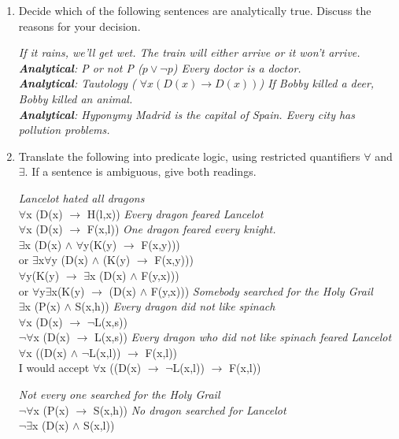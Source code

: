 \documentclass[a4paper]{article}
\newcommand{\ix}{\ex\it}
\newcommand{\into}{\ensuremath{\rightarrow}}
\begin{document}
\begin{enumerate}
\item Decide which of the following sentences are analytically
  true. Discuss the reasons for your decision.
\begin{exe}
  \ix If it rains, we'll get wet. 
  \ix The train will either arrive or it won't arrive.
  \\ \textnormal{\textbf{Analytical}: P or not P ($p \vee \neg p$)}
  \ix Every doctor is a doctor.
  \\ \textnormal{\textbf{Analytical}: Tautology ( $\forall x (D(x) \into D(x))$)}
  \ix If Bobby killed a deer, Bobby killed an animal.
  \\ \textnormal{\textbf{Analytical}: Hyponymy}
  \ix Madrid is the capital of Spain. 
  \ix Every city has pollution problems. 
\end{exe}

\newpage
\item  Translate the following into predicate logic, using restricted
  quantifiers $\forall$ and $\exists$.  If a sentence is ambiguous,
  give both readings.
 \begin{exe}
    \ex \textit{Lancelot hated all dragons} \\
    $\forall$x (D(x)  $\into$ H(l,x))
    \ex \textit{Every dragon feared Lancelot} \\
    $\forall$x (D(x)  $\into$ F(x,l))
    \ex \textit{One dragon feared every knight.} \\
    $\exists$x  (D(x)  $\wedge$ $\forall$y(K(y)  $\into$ F(x,y)))
    \\ or  $\exists$x$\forall$y (D(x)  $\wedge$ (K(y)  $\into$ F(x,y)))
 \\   $\forall$y(K(y)   $\into$ $\exists$x  (D(x)  $\wedge$  F(y,x)))
 \\ or $\forall$y$\exists$x(K(y)   $\into$   (D(x)  $\wedge$  F(y,x)))
    \ex \textit{Somebody searched for the Holy Grail} \\
    $\exists$x  (P(x)  $\wedge$ S(x,h))
    \ex \textit{Every dragon did not like spinach} \\
    $\forall$x (D(x)  $\into$ $\neg$L(x,s))
    \\ $\neg\forall$x (D(x)  $\into$ L(x,s))
    \ex \textit{Every dragon who did not like spinach feared Lancelot} \\
    $\forall$x ((D(x)  $\wedge$ $\neg$L(x,l)) $\into$  F(x,l))
    \\ I would accept  $\forall$x ((D(x)  $\into$ $\neg$L(x,l)) $\into$  F(x,l))

    \ex \textit{Not every one searched for the Holy Grail} \\
    $\neg\forall$x (P(x)  $\into$ S(x,h))
    \ex \textit{No dragon searched for Lancelot}
\\
    $\neg\exists$x (D(x)  $\wedge$ S(x,l))
  \end{exe}
\end{enumerate}
\end{document}
